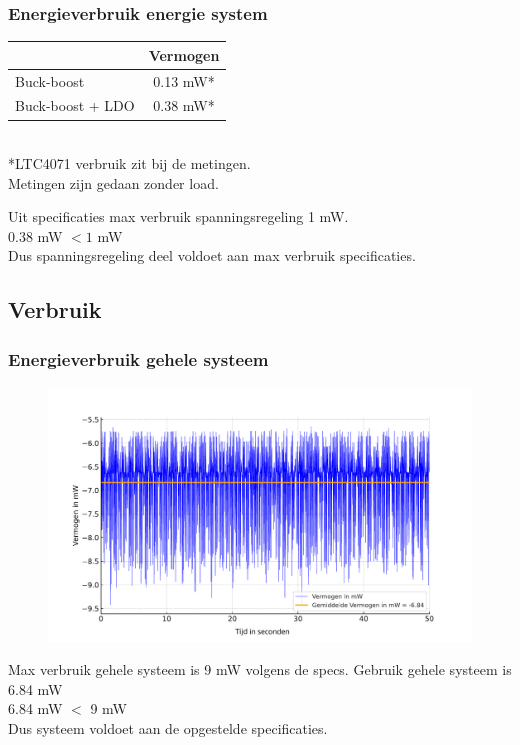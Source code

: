     \begin{frame}
        \frametitle{Energieverbruik energie system}
        \begin{tabular}{|l|c|}
        \hline
            & Vermogen \\ \hline
            Buck-boost & 0.13 mW* \\ \hline
            Buck-boost + LDO  & 0.38 mW*\\ \hline
        \end{tabular} \\       
        *LTC4071 verbruik zit bij de metingen.\\
        Metingen zijn gedaan zonder load.
        \vspace{1cm}

            \centering
            Uit specificaties max verbruik spanningsregeling 1 mW.\\ 
            $0.38$ mW $< 1$ mW\\
            Dus spanningsregeling deel voldoet aan max verbruik specificaties. 

    \end{frame}
    \subsection{Verbruik}
    \begin{frame}
        \frametitle{Energieverbruik gehele systeem}
        \begin{figure}[h]
            \centering
            \includegraphics[scale=0.35]{img/vermogensMeting.pdf}
        \end{figure}
        \centering
        Max verbruik gehele systeem is 9 mW volgens de specs.
        Gebruik gehele systeem is 6.84 mW\\
        6.84 mW $<$ 9 mW\\
        Dus systeem voldoet aan de opgestelde specificaties.

    \end{frame}

    
        
    
